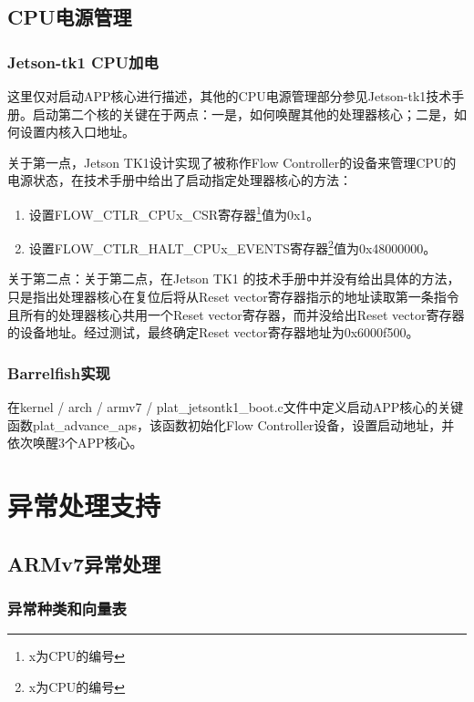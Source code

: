 \documentclass[a4paper, 12pt]{report}
\begin{document}
    \section{CPU电源管理}
    
    \subsection{Jetson-tk1 CPU加电}
    
    这里仅对启动APP核心进行描述，其他的CPU电源管理部分参见Jetson-tk1技术手册。启动第二个核的关键在于两点：一是，如何唤醒其他的处理器核心；二是，如何设置内核入口地址。
    
    关于第一点，Jetson TK1设计实现了被称作Flow Controller的设备来管理CPU的电源状态，在技术手册中给出了启动指定处理器核心的方法：
    
    \begin{enumerate}
        \item 设置FLOW\_CTLR\_CPUx\_CSR寄存器\footnote{x为CPU的编号}值为0x1。
        \item 设置FLOW\_CTLR\_HALT\_CPUx\_EVENTS寄存器\footnote{x为CPU的编号}值为0x48000000。
    \end{enumerate}

    关于第二点：关于第二点，在Jetson TK1 的技术手册中并没有给出具体的方法，只是指出处理器核心在复位后将从Reset vector寄存器指示的地址读取第一条指令且所有的处理器核心共用一个Reset vector寄存器，而并没给出Reset vector寄存器的设备地址。经过测试，最终确定Reset vector寄存器地址为0x6000f500。

    \subsection{Barrelfish实现}
    
    在kernel / arch / armv7 / plat\_jetsontk1\_boot.c文件中定义启动APP核心的关键函数plat\_advance\_aps，该函数初始化Flow Controller设备，设置启动地址，并依次唤醒3个APP核心。
    
    \chapter{异常处理支持}
	
	\section{ARMv7异常处理}
    
    \subsection{异常种类和向量表}
    
\end{document}
